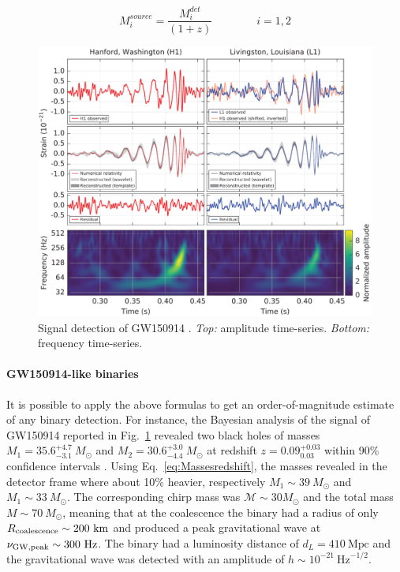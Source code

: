 \documentclass[a4paper,titlepage]{book}     	%
\newcommand{\sun}{\ensuremath{_\odot}}
\newcommand{\msun}{\ensuremath{M\sun}}
\begin{document}
\begin{equation}\label{eq:Massesredshift}
	M_i^{source} = \frac{M_i^{det}}{(1+z)} \qquad \qquad i=1,2
\end{equation}


\begin{figure}[h]
	\includegraphics[width=\textwidth]{./images/GW150914.png}
	\caption{Signal detection of GW150914 \cite{Abbott2016firstGW}. \textit{Top:} amplitude time-series. \textit{Bottom:} frequency time-series.}\label{fig:GW150914}
\end{figure}

\paragraph{GW150914-like binaries} It is possible to apply the above formulas to get an order-of-magnitude estimate of any binary detection. For instance, the Bayesian analysis of the signal of GW150914 reported in Fig.\ \ref{fig:GW150914} revealed two black holes of masses $M_1=35.6^{+4.7}_{-3.1} ~ \msun$ and $M_2=30.6^{+3.0}_{-4.4} ~ \msun$ at redshift $z=0.09^{+0.03}_{0.03}$ within 90\% confidence intervals \cite{GWTC-1}. Using Eq.\ \ref{eq:Massesredshift}, the masses revealed in the detector frame where about 10\% heavier, respectively $M_1 \sim 39 ~ \msun$ and $M_1 \sim 33 ~ \msun$. The corresponding chirp mass was $\mathcal{M} \sim 30 \msun$ and the total mass $M \sim 70 ~ \msun$, meaning that at the coalescence the binary had a radius of only $R_{\rm coalescence} \sim 200~\text{km}$ and produced a peak gravitational wave at $\nu_{\rm GW, peak} \sim 300 ~\text{Hz}$. The binary had a luminosity distance of $d_L=410~\text{Mpc}$ and the gravitational wave was detected with an amplitude of $h \sim 10^{-21}~ \text{Hz}^{-1/2}$.
\end{document}
